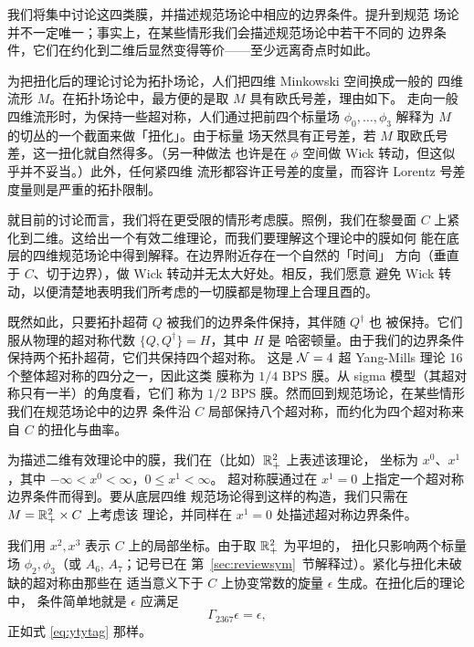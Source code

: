 我们将集中讨论这四类膜，并描述规范场论中相应的边界条件。提升到规范
场论并不一定唯一；事实上，在某些情形我们会描述规范场论中若干不同的
边界条件，它们在约化到二维后显然变得等价——至少远离奇点时如此。

为把扭化后的理论讨论为拓扑场论，人们把四维 Minkowski 空间换成一般的
四维流形 $M$。在拓扑场论中，最方便的是取 $M$ 具有欧氏号差，理由如下。
走向一般四维流形时，为保持一些超对称，人们通过把前四个标量场
$\phi_0,\dots,\phi_3$ 解释为 $M$ 的切丛的一个截面来做「扭化」。由于标量
场天然具有正号差，若 $M$ 取欧氏号差，这一扭化就自然得多。（另一种做法
也许是在 $\phi$ 空间做 Wick 转动，但这似乎并不妥当。）此外，任何紧四维
流形都容许正号差的度量，而容许 Lorentz 号差度量则是严重的拓扑限制。

就目前的讨论而言，我们将在更受限的情形考虑膜。照例，我们在黎曼面 $C$
上紧化到二维。这给出一个有效二维理论，而我们要理解这个理论中的膜如何
能在底层的四维规范场论中得到解释。在边界附近存在一个自然的「时间」
方向（垂直于 $C$、切于边界），做 Wick 转动并无太大好处。相反，我们愿意
避免 Wick 转动，以便清楚地表明我们所考虑的一切膜都是物理上合理且酉的。

既然如此，只要拓扑超荷 $Q$ 被我们的边界条件保持，其伴随 $Q^\dagger$ 也
被保持。它们服从物理的超对称代数 $\{Q,Q^\dagger\}=H$，其中 $H$ 是
哈密顿量。由于我们的边界条件保持两个拓扑超荷，它们共保持四个超对称。
这是 ${\EUN}=4$ 超 Yang-Mills 理论 16 个整体超对称的四分之一，因此这类
膜称为 $1/4$ BPS 膜。从 sigma 模型（其超对称只有一半）的角度看，它们
称为 $1/2$ BPS 膜。然而回到规范场论，在某些情形我们在规范场论中的边界
条件沿 $C$ 局部保持八个超对称，而约化为四个超对称来自 $C$ 的扭化与曲率。

为描述二维有效理论中的膜，我们在（比如）$\Bbb{R}^2_+$ 上表述该理论，
坐标为 $x^0$、$x^1$，其中 $-\infty< x^0< \infty$，$0\leq x^1 <\infty$。
超对称膜通过在 $x^1=0$ 上指定一个超对称边界条件而得到。要从底层四维
规范场论得到这样的构造，我们只需在 $M=\Bbb{R}^2_+\times C$ 上考虑该
理论，并同样在 $x^1=0$ 处描述超对称边界条件。

我们用 $x^2,x^3$ 表示 $C$ 上的局部坐标。由于取 $\Bbb{R}^2_+$ 为平坦的，
扭化只影响两个标量场 $\phi_2,\phi_3$（或 $A_6$, $A_7$；记号已在
第~\ref{sec:reviewsym}~节解释过）。紧化与扭化未破缺的超对称由那些在
适当意义下于 $C$ 上协变常数的旋量 $\epsilon$ 生成。在扭化后的理论中，
条件简单地就是 $\epsilon$ 应满足 %
\setcounter{equation}{0}
\begin{equation}\label{eq:ucuv}
\Gamma_{2367}\epsilon=\epsilon,
\end{equation}
 正如式 \eqref{eq:ytytag} 那样。

